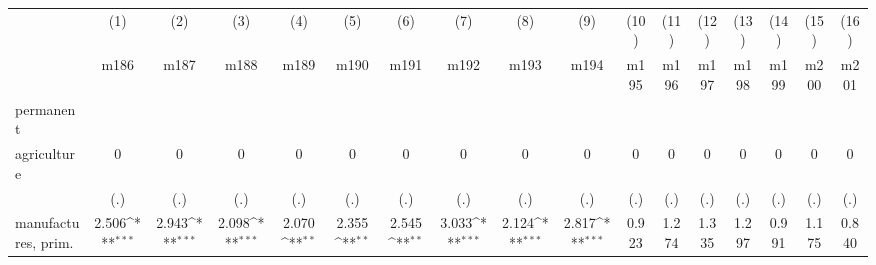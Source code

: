 {
\def\sym#1{\ifmmode^{#1}\else\(^{#1}\)\fi}
\begin{tabular}{l*{16}{c}}
\hline\hline
                    &\multicolumn{1}{c}{(1)}&\multicolumn{1}{c}{(2)}&\multicolumn{1}{c}{(3)}&\multicolumn{1}{c}{(4)}&\multicolumn{1}{c}{(5)}&\multicolumn{1}{c}{(6)}&\multicolumn{1}{c}{(7)}&\multicolumn{1}{c}{(8)}&\multicolumn{1}{c}{(9)}&\multicolumn{1}{c}{(10)}&\multicolumn{1}{c}{(11)}&\multicolumn{1}{c}{(12)}&\multicolumn{1}{c}{(13)}&\multicolumn{1}{c}{(14)}&\multicolumn{1}{c}{(15)}&\multicolumn{1}{c}{(16)}\\
                    &\multicolumn{1}{c}{m186}&\multicolumn{1}{c}{m187}&\multicolumn{1}{c}{m188}&\multicolumn{1}{c}{m189}&\multicolumn{1}{c}{m190}&\multicolumn{1}{c}{m191}&\multicolumn{1}{c}{m192}&\multicolumn{1}{c}{m193}&\multicolumn{1}{c}{m194}&\multicolumn{1}{c}{m195}&\multicolumn{1}{c}{m196}&\multicolumn{1}{c}{m197}&\multicolumn{1}{c}{m198}&\multicolumn{1}{c}{m199}&\multicolumn{1}{c}{m200}&\multicolumn{1}{c}{m201}\\
\hline
permanent           &                     &                     &                     &                     &                     &                     &                     &                     &                     &                     &                     &                     &                     &                     &                     &                     \\
agriculture         &           0         &           0         &           0         &           0         &           0         &           0         &           0         &           0         &           0         &           0         &           0         &           0         &           0         &           0         &           0         &           0         \\
                    &         (.)         &         (.)         &         (.)         &         (.)         &         (.)         &         (.)         &         (.)         &         (.)         &         (.)         &         (.)         &         (.)         &         (.)         &         (.)         &         (.)         &         (.)         &         (.)         \\
[1em]
manufactures, prim. &       2.506\sym{***}&       2.943\sym{***}&       2.098\sym{***}&       2.070\sym{**} &       2.355\sym{**} &       2.545\sym{**} &       3.033\sym{***}&       2.124\sym{***}&       2.817\sym{***}&       0.923         &       1.274         &       1.335         &       1.297         &       0.991         &       1.175         &       0.840         \\

\end{tabular}}
